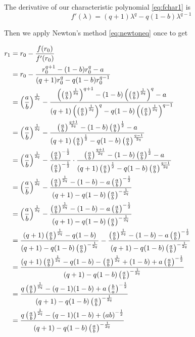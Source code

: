 \begin{result}
\begin{pf}
The derivative of our characteristic polynomial \eqref{eq:fchar1} is
\begin{equation} \label{eq:fcharprime1}
f'(\lambda) = (q+1)\lambda^q - q(1-b)\lambda^{q-1}
\end{equation}

Then we apply Newton's method \eqref{eq:newtoneq} once to get

$\begin{aligned}
r_1 
&= r_0 - \frac{f(r_0)}{f'(r_0)} \\
&= r_0 - \frac{r_0^{q+1} - (1-b)r_0^q - a}{(q+1)r_0^q - q(1-b)r_0^{q-1}} \\
&= \left(\frac{a}{b}\right)^{\frac1{2q}} - \frac{\left(\left(\frac{a}{b}\right)^{\frac1{2q}}\right)^{q+1} - (1-b)\left(\left(\frac{a}{b}\right)^{\frac1{2q}}\right)^q - a}{(q+1)\left(\left(\frac{a}{b}\right)^{\frac1{2q}}\right)^q - q(1-b)\left(\left(\frac{a}{b}\right)^{\frac1{2q}}\right)^{q-1}} \\
&= \left(\frac{a}{b}\right)^{\frac1{2q}} - \frac{\left(\frac{a}{b}\right)^{\frac{q+1}{2q}} - (1-b)\left(\frac{a}{b}\right)^{\frac12} - a}{(q+1)\left(\frac{a}{b}\right)^{\frac12} - q(1-b)\left(\frac{a}{b}\right)^{\frac{q-1}{2q}}}\\
&= \left(\frac{a}{b}\right)^{\frac1{2q}} - \frac{\left(\frac{a}{b}\right)^{-\frac12}}{\left(\frac{a}{b}\right)^{-\frac12}} \cdot
\frac{\left(\frac{a}{b}\right)^{\frac{q+1}{2q}} - (1-b)\left(\frac{a}{b}\right)^{\frac12} - a}{(q+1)\left(\frac{a}{b}\right)^{\frac12} - q(1-b)\left(\frac{a}{b}\right)^{\frac{q-1}{2q}}}\\
&= \left(\frac{a}{b}\right)^{\frac1{2q}} - \frac{\left(\frac{a}{b}\right)^{\frac1{2q}} - (1-b) - a\left(\frac{a}{b}\right)^{-\frac12}}{(q+1) - q(1-b)\left(\frac{a}{b}\right)^{-\frac{1}{2q}}}\\
&= \left(\frac{a}{b}\right)^{\frac1{2q}} - \frac{\left(\frac{a}{b}\right)^{\frac1{2q}} - (1-b) - a\left(\frac{a}{b}\right)^{-\frac12}}{(q+1) - q(1-b)\left(\frac{a}{b}\right)^{-\frac{1}{2q}}}\\
&= \frac{(q+1)\left(\frac{a}{b}\right)^{\frac{1}{2q}} - q(1-b)}{(q+1) - q(1-b)\left(\frac{a}{b}\right)^{-\frac{1}{2q}}} - \frac{\left(\frac{a}{b}\right)^{\frac1{2q}} - (1-b) - a\left(\frac{a}{b}\right)^{-\frac12}}{(q+1) - q(1-b)\left(\frac{a}{b}\right)^{-\frac{1}{2q}}}\\
&= \frac{(q+1)\left(\frac{a}{b}\right)^{\frac{1}{2q}} - q(1-b) - \left(\frac{a}{b}\right)^{\frac1{2q}} + (1-b) + a\left(\frac{a}{b}\right)^{-\frac12}}{(q+1) - q(1-b)\left(\frac{a}{b}\right)^{-\frac{1}{2q}}}\\
&= \frac{q\left(\frac{a}{b}\right)^{\frac{1}{2q}} - (q-1)(1-b) + a\left(\frac{b}{a}\right)^{-\frac12}}{(q+1) - q(1-b)\left(\frac{a}{b}\right)^{-\frac{1}{2q}}}\\
&= \frac{q\left(\frac{a}{b}\right)^{\frac{1}{2q}} - (q-1)(1-b) + \left(ab\right)^{-\frac12}}{(q+1) - q(1-b)\left(\frac{a}{b}\right)^{-\frac{1}{2q}}}\\
\end{aligned}$
\end{pf}
\end{result}

